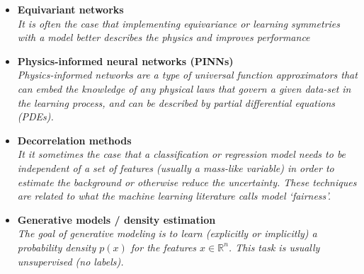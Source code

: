 \documentclass[12pt,letterpaper]{article}
\begin{document}
\begin{itemize}
\item \textbf{Equivariant networks}~\cite{Brehmer:2024yqw,Maitre:2024hzp,Hendi:2024yin,Cruz:2024grk,Spinner:2024hjm,Bhardwaj:2024wrf,Sahu:2024sts,Bhardwaj:2024djv,Chatterjee:2024pbp,Bressler:2024wzc,Gu:2024lrz,Bright-Thonney:2023gdl,Bogatskiy:2023nnw,Murnane:2023kfm,Lehner:2023prf,Forestano:2023qcy,Buhmann:2023pmh,Aronsson:2023rli,Forestano:2023fpj,Lehner:2023bba,Hao:2022zns,Bogatskiy:2022czk,Favoni:2022mcg,Bogatskiy:2022hub,Shi:2022yqw,Gong:2022lye,Bulusu:2021njs,Favoni:2020reg,Dolan:2020qkr,Kanwar:2003.06413}
\\\textit{It is often the case that implementing equivariance or learning symmetries with a model better describes the physics and improves performance}
\item \textbf{Physics-informed neural networks (PINNs)}~\cite{Terin:2024iyy,Vatellis:2024vjl,Panahi:2024sfb}
\\\textit{Physics-informed networks are a type of universal function approximators that can embed the knowledge of any physical laws that govern a given data-set in the learning process, and can be described by partial differential equations (PDEs).}
\item \textbf{Decorrelation methods}~\cite{Algren:2023spv,Rabusov:2022woa,Das:2022cjl,Klein:2022hdv,Mikuni:2021nwn,Dolan:2021pml,Ghosh:2021hrh,Kitouni:2020xgb,Kasieczka:2020pil,clavijo2020adversarial,10.1088/2632-2153/ab9023,Rogozhnikov:2014zea,Wunsch:2019qbo,Englert:2018cfo,Xia:2018kgd,DiscoFever,ATL-PHYS-PUB-2018-014,Bradshaw:2019ipy,Shimmin:2017mfk,Stevens:2013dya,Moult:2017okx,Dolen:2016kst,Louppe:2016ylz}
\\\textit{It it sometimes the case that a classification or regression model needs to be independent of a set of features (usually a mass-like variable) in order to estimate the background or otherwise reduce the uncertainty.  These techniques are related to what the machine learning literature calls model `fairness'.}
\item \textbf{Generative models / density estimation}
\\\textit{The goal of generative modeling is to learn (explicitly or implicitly) a probability density $p(x)$ for the features $x\in\mathbb{R}^n$.  This task is usually unsupervised (no labels).}
	\begin{itemize}

\end{itemize}
\end{itemize}
\end{document}
